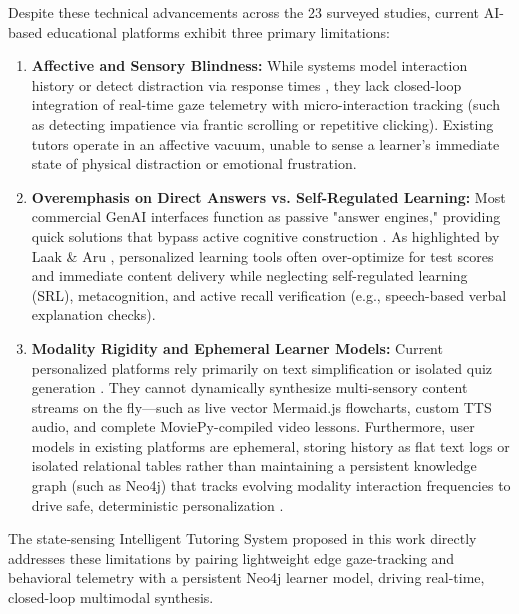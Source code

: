 Despite these technical advancements across the 23 surveyed studies, current AI-based educational platforms exhibit three primary limitations:

\begin{enumerate}
    \item \textbf{Affective and Sensory Blindness:} While systems model interaction history \cite{jier2025ai} or detect distraction via response times \cite{almetnawy2025adaptive}, they lack closed-loop integration of real-time gaze telemetry with micro-interaction tracking (such as detecting impatience via frantic scrolling or repetitive clicking). Existing tutors operate in an affective vacuum, unable to sense a learner's immediate state of physical distraction or emotional frustration.
    \item \textbf{Overemphasis on Direct Answers vs. Self-Regulated Learning:} Most commercial GenAI interfaces function as passive "answer engines," providing quick solutions that bypass active cognitive construction \cite{jurenka2025towards}. As highlighted by Laak \& Aru \cite{laak2025ai}, personalized learning tools often over-optimize for test scores and immediate content delivery while neglecting self-regulated learning (SRL), metacognition, and active recall verification (e.g., speech-based verbal explanation checks).
    \item \textbf{Modality Rigidity and Ephemeral Learner Models:} Current personalized platforms rely primarily on text simplification or isolated quiz generation \cite{krouska2024chatgpt, pesovski2024generative}. They cannot dynamically synthesize multi-sensory content streams on the fly—such as live vector Mermaid.js flowcharts, custom TTS audio, and complete MoviePy-compiled video lessons. Furthermore, user models in existing platforms are ephemeral, storing history as flat text logs or isolated relational tables rather than maintaining a persistent knowledge graph (such as Neo4j) that tracks evolving modality interaction frequencies to drive safe, deterministic personalization \cite{farhah2025enhancing, sjcs2024generative}.
\end{enumerate}

The state-sensing Intelligent Tutoring System proposed in this work directly addresses these limitations by pairing lightweight edge gaze-tracking and behavioral telemetry with a persistent Neo4j learner model, driving real-time, closed-loop multimodal synthesis.
